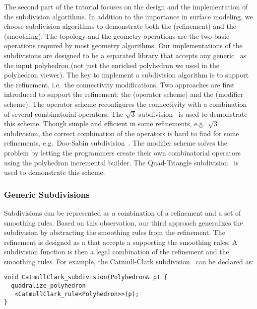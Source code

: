 \documentclass[letter,twocolumn]{article}
\begin{document}
The second part of the tutorial focuses on the design and the
implementation of the subdivision algorithms.  In addition to the
importance in surface modeling, we choose subdivision algorithms to
demonstrate both the  (refinement) and the
 (smoothing). The topology and the geometry
operations are the two basic operations required by most geometry
algorithms. Our implementations of the subdivisions are designed to be
a separated library that accepts any generic \poly\ as the input
polyhedron (not just the enriched polyhedron we used in the polyhedron
viewer). The key to implement a subdivision algorithm is to support
the refinement, i.e.\ the connectivity modifications.  Two approaches
are first introduced to support the refinement: the  (operator scheme) and
the  (modifier scheme).  The operator
scheme reconfigures the connectivity with a combination of several
combinatorial operators. The $\sqrt{3}$ subdivision~\cite{sqrt3} is
used to demonstrate this scheme. Though simple and efficient in some
refinements, e.g.\ $\sqrt{3}$ subdivision, the correct combination of
the operators is hard to find for some refinements, e.g.\ Doo-Sabin
subdivision~\cite{ds}. The modifier scheme solves the problem by
letting the programmers create their own combinatorial operators using
the polyhedron incremental builder.  The Quad-Triangle
subdivision~\cite{qts,l-pg-03} is used to demonstrate this scheme.

\subsubsection*{Generic Subdivisions}

Subdivisions can be represented as a combination of a refinement and a
set of smoothing rules. Based on this observation, our third approach
generalizes the subdivision by abstracting the smoothing rules from
the refinement. The refinement is designed as a 
that accepts a  supporting the smoothing rules. A
subdivision function is then a legal combination of the refinement and
the smoothing rules.  For example, the Catmull-Clark
subdivision~\cite{cc} can be declared as:
\begin{lstlisting}
void CatmullClark_subdivision(Polyhedron& p) {    
  quadralize_polyhedron
   <CatmullClark_rule<Polyhedron>>(p);  
}
\end{lstlisting}
\end{document}
